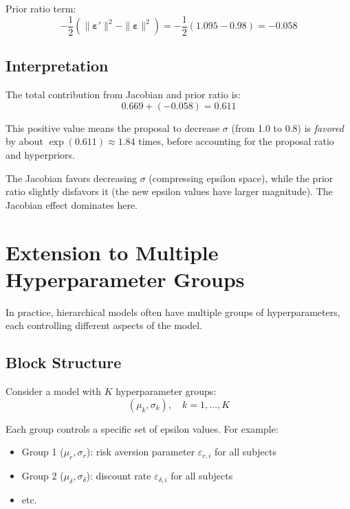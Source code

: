 \documentclass[11pt,a4paper]{article}
\theoremstyle{definition}
\newcommand{\eps}{\varepsilon}
\begin{document}
Prior ratio term:
\begin{equation}
    -\frac{1}{2}(\|\bm{\eps}'\|^2 - \|\bm{\eps}\|^2) = -\frac{1}{2}(1.095 - 0.98) = -0.058
\end{equation}

\subsection{Interpretation}

The total contribution from Jacobian and prior ratio is:
\begin{equation}
    0.669 + (-0.058) = 0.611
\end{equation}

This positive value means the proposal to decrease $\sigma$ (from 1.0 to 0.8) is
\emph{favored} by about $\exp(0.611) \approx 1.84$ times, before accounting for
the proposal ratio and hyperpriors.

The Jacobian favors decreasing $\sigma$ (compressing epsilon space), while the prior
ratio slightly disfavors it (the new epsilon values have larger magnitude). The
Jacobian effect dominates here.

\section{Extension to Multiple Hyperparameter Groups}
\label{sec:multiple_hyper}

In practice, hierarchical models often have multiple groups of hyperparameters,
each controlling different aspects of the model.

\subsection{Block Structure}

Consider a model with $K$ hyperparameter groups:
\begin{equation}
    (\mu_k, \sigma_k), \quad k = 1, \ldots, K
\end{equation}

Each group controls a specific set of epsilon values. For example:
\begin{itemize}
    \item Group 1 ($\mu_r, \sigma_r$): risk aversion parameter $\eps_{r,i}$ for all subjects
    \item Group 2 ($\mu_\delta, \sigma_\delta$): discount rate $\eps_{\delta,i}$ for all subjects
    \item etc.
\end{itemize}
\end{document}
